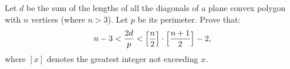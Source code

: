 Let $ d$ be the sum of the lengths of all the diagonals of a plane convex polygon with $ n$ vertices (where $ n>3$). Let $ p$ be its perimeter. Prove that:
\[ n-3<{2d\over p}<\Bigl[{n\over2}\Bigr]\cdot\Bigl[{n+1\over 2}\Bigr]-2,\]
where $ [x]$ denotes the greatest integer not exceeding $ x$.
